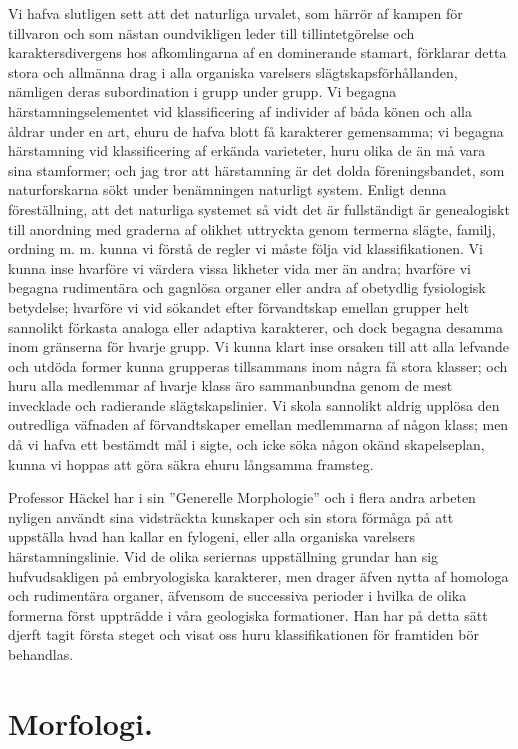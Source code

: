 Vi hafva slutligen sett att det naturliga urvalet, som härrör af kampen för tillvaron och som nästan oundvikligen leder till tillintetgörelse och karaktersdivergens hos afkomlingarna af en dominerande stamart, förklarar detta stora och allmänna drag i alla organiska varelsers slägtskapsförhållanden, nämligen deras subordination i grupp under grupp. Vi begagna härstamningselementet vid klassificering af individer af båda könen och alla åldrar under en art, ehuru de hafva blott få karakterer gemensamma; vi begagna härstamning vid klassificering af erkända varieteter, huru olika de än må vara sina stamformer; och jag tror att härstamning är det dolda föreningsbandet, som naturforskarna sökt under benämningen naturligt system. Enligt denna föreställning, att det naturliga systemet så vidt det är fullständigt är genealogiskt till anordning med graderna af olikhet uttryckta genom termerna slägte, familj, ordning m. m. kunna vi förstå de regler vi måste följa vid klassifikationen. Vi kunna inse hvarföre vi värdera vissa likheter vida mer än andra; hvarföre vi begagna rudimentära och gagnlösa organer eller andra af obetydlig fysiologisk betydelse; hvarföre vi vid sökandet efter förvandtskap emellan grupper helt sannolikt förkasta analoga eller adaptiva karakterer, och dock begagna desamma inom gränserna för hvarje grupp. Vi kunna klart inse orsaken till att alla lefvande och utdöda former kunna grupperas tillsammans inom några få stora klasser; och huru alla medlemmar af hvarje klass äro sammanbundna genom de mest invecklade och radierande slägtskapslinier. Vi skola sannolikt aldrig upplösa den outredliga väfnaden af förvandtskaper emellan medlemmarna af någon klass; men då vi hafva ett bestämdt mål i sigte, och icke söka någon okänd skapelseplan, kunna vi hoppas att göra säkra ehuru långsamma framsteg.

Professor Häckel har i sin ”Generelle Morphologie” och i flera andra arbeten nyligen användt sina vidsträckta kunskaper och sin stora förmåga på att uppställa hvad han kallar en fylogeni, eller alla organiska varelsers härstamningslinie. Vid de olika seriernas uppställning grundar han sig hufvudsakligen på embryologiska karakterer, men drager äfven nytta af homologa och rudimentära organer, äfvensom de successiva perioder i hvilka de olika formerna först uppträdde i våra geologiska formationer. Han har på detta sätt djerft tagit första steget och visat oss huru klassifikationen för framtiden bör behandlas.



\section{Morfologi.}

